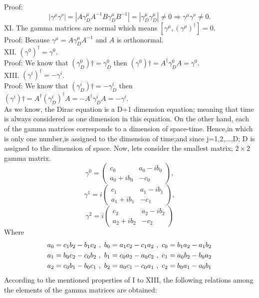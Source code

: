 \documentclass[twocolumn,aps,prb,showpacs]{revtex4-1}
\begin{document}
Proof:
$$
|\gamma^{\mu}\gamma^{\nu}|=|A \gamma^{\mu}_{D}A^{-1}B\gamma^{\mu}_{D}B^{-1}|=|\gamma^{\mu}_{D}\gamma^{\mu}_{D}|\neq0\Rightarrow\gamma^{\mu}\gamma^{\nu}\neq 0.
$$
XI.	The gamma matrices are normal which means $[\gamma^{\mu},(\gamma^{\mu})^{\dagger}]=0$.\\
Proof: Because $\gamma^{\mu}=A \gamma^{\mu}_{D}A^{-1}$ and $A$ is orthonormal.\\
XII.	$(\gamma^{0})^{\dagger}=\gamma^{0}$.\\
Proof: We know that $(\gamma^{0}_{D})\dagger=\gamma^{0}_{D}$ then $(\gamma^{0})\dagger=A^{\dagger}\gamma^{0}_{D}A=\gamma^{0}$.\\
XIII.		$(\gamma^{i})^{\dagger}=-\gamma^{i}$.\\
Proof:  We know that $(\gamma^{i}_{D})\dagger=-\gamma^{i}_{D}$ then $(\gamma^{i})\dagger=A^{\dagger}(\gamma^{i}_{D})^{\dagger}A=-A^{\dagger}\gamma^{i}_{D}A=-\gamma^{i}$.\\
As we know, the Dirac equation is a D+1 dimension equation; meaning that time is always considered as one dimension in this equation. On the other hand, each of the gamma matrices corresponds to a dimension of space-time. Hence,in which is only one number,is assigned to the dimension of time;and since j=1,2,...,D; D is assigned to the dimension of space. 
Now, lets consider the smallest matrix; $2\times2$ gamma matrix.
$$
\gamma^{0}=
\begin{pmatrix}
c_{0} & a_{0}-ib_{0} \\
a_{0}+ib_{0} & -c_{0}
\end{pmatrix},$$
$$
\gamma^{1}=i
\begin{pmatrix}
c_{1} & a_{1}-ib_{1} \\
a_{1}+ib_{1} & -c_{1}
\end{pmatrix}, $$
$$
\gamma^{2}=i
\begin{pmatrix}
c_{2} & a_{2}-ib_{2} \\
a_{2}+ib_{2} & -c_{2}
\end{pmatrix}
$$
Where
\begin{align}
	a_{0}=c_{1}b_{2}-b_{1}c_{2}\ ,\ b_{0}=a_{1}c_{2}-c_{1}a_{2}\ ,\ c_{0}=b_{1}a_{2}-a_{1}b_{2}\notag \\
	a_{1}=b_{0}c_{2}-c_{0}b_{2}\ ,\ b_{1}=c_{0}a_{2}-a_{0}c_{2}\ ,\ c_{1}=a_{0}b_{2}-b_{0}a_{2}\notag \\
	a_{2}=c_{0}b_{1}-b_{0}c_{1}\ ,\ b_{2}=a_{0}c_{1}-c_{0}a_{1}\ ,\ c_{2}=b_{0}a_{1}-a_{0}b_{1} 	
\end{align}
According to the mentioned properties of I to XIII, the following relations among the elements of the gamma matrices are obtained:
\end{document}
